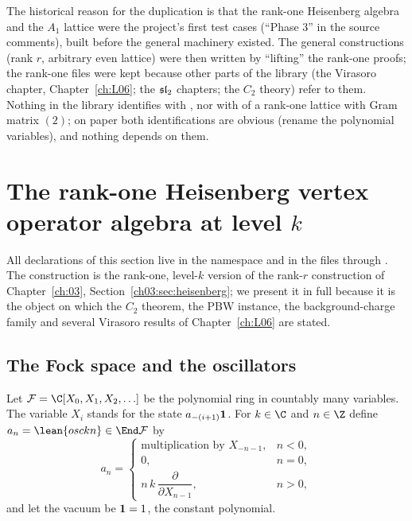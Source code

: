The historical reason for the duplication is that the rank-one Heisenberg algebra and the $A_1$
lattice were the project's first test cases (``Phase 3'' in the source comments), built before the
general machinery existed. The general constructions (rank $r$, arbitrary even lattice) were then
written by ``lifting'' the rank-one proofs; the rank-one files were kept because other parts of the
library (the Virasoro chapter, Chapter~\ref{ch:L06}; the $\mathfrak{sl}_2$ chapters; the $C_2$ theory) refer
to them. Nothing in the library identifies  with
, nor  with  of a rank-one lattice
with Gram matrix $(2)$; on paper both identifications are obvious (rename the polynomial variables),
and nothing depends on them.

\section{The rank-one Heisenberg vertex operator algebra at level \texorpdfstring{$k$}{k}}\label{l05:sec:heis1}

All declarations of this section live in the namespace  and in the files
 through
. The construction is the
rank-one, level-$k$ version of the rank-$r$ construction of Chapter~\ref{ch:03},
Section~\ref{ch03:sec:heisenberg}; we present it in full because it is the object on which the
$C_2$ theorem, the PBW instance, the background-charge family and several Virasoro results of
Chapter~\ref{ch:L06} are stated.

\subsection{The Fock space and the oscillators}

\begin{definition}\label{l05:def:fock}
Let $\lfiveF=\C[X_0,X_1,X_2,\ldots]$ be the polynomial ring in countably many variables. The variable
$X_i$ stands for the state $a_{-(i+1)}\mathbf{1}$. For $k\in\C$ and $n\in\Z$ define
$a_n=\lean{osc k n}\in\End\lfiveF$ by
\begin{equation*}
 a_n=\begin{cases}\text{multiplication by }X_{-n-1}, & n<0,\\ 0, & n=0,\\
 n\,k\,\dfrac{\partial}{\partial X_{n-1}}, & n>0,\end{cases}
\end{equation*}
and let the vacuum be $\mathbf{1}=1$, the constant polynomial.
\end{definition}

